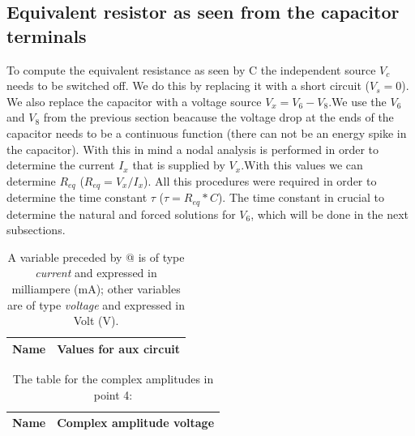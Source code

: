 \subsection{Equivalent resistor as seen from the capacitor terminals}

To compute the equivalent resistance as seen by C the independent source $V_c$ needs to be switched off. We do this by replacing it with a short circuit ($V_s=0$). We also replace the capacitor with a voltage source $V_x=V_6-V_8$.We use the $V_6$ and $V_8$ from the previous section beacause the voltage drop at the ends of the capacitor needs to be a continuous function (there can not be an energy spike in the capacitor). With this in mind a nodal analysis is performed in order to determine the current $I_x$ that is supplied by $V_x$.With this values we can determine $R_{eq}$ ($R_{eq}=V_x/I_x$). All this procedures were required in order to determine the time constant $\tau$ ($\tau=R_{eq}*C$). The time constant in crucial to determine the natural and forced solutions for $V_6$, which will be done in the next subsections. 

 \pagebreak 
\begin{table}[h]
  \centering
  \begin{tabular}{|l|r|}
    \hline    
    {\bf Name} & {\bf Values for aux circuit}\\ \hline
    
  \end{tabular}
  \caption{A variable preceded by @ is of type {\em current}
    and expressed in milliampere (mA); other variables are of type {\it voltage} and expressed in
    Volt (V).}
  \label{tab:equivalent resistor}
\end{table}



 \pagebreak 
\begin{table}[h]
  \centering
  \begin{tabular}{|l|r|}
    \hline    
    {\bf Name} & {\bf Complex amplitude voltage}\\ \hline
    
  \end{tabular}
  \caption{The table for the complex amplitudes in point 4:}
  \label{tab:equivalent resistor}
\end{table}

